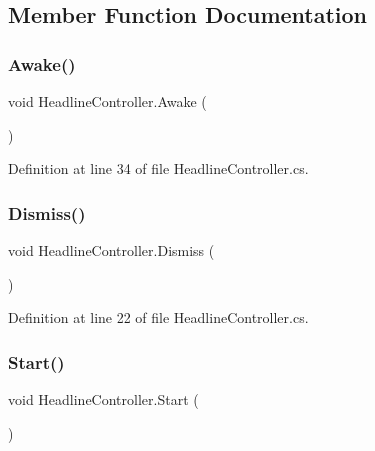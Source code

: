 \subsection{Member Function Documentation}
\mbox{\label{class_headline_controller_adb69e776ca5b30c61080f59057ad1137}} 
\subsubsection{\texorpdfstring{Awake()}{Awake()}}
{\footnotesize\ttfamily void Headline\+Controller.\+Awake (\begin{DoxyParamCaption}{ }\end{DoxyParamCaption})}



Definition at line 34 of file Headline\+Controller.\+cs.

\mbox{\label{class_headline_controller_acd329fcd0eb7c55ceecdf01d14774847}} 
\subsubsection{\texorpdfstring{Dismiss()}{Dismiss()}}
{\footnotesize\ttfamily void Headline\+Controller.\+Dismiss (\begin{DoxyParamCaption}{ }\end{DoxyParamCaption})}



Definition at line 22 of file Headline\+Controller.\+cs.

\mbox{\label{class_headline_controller_afdc68788b7f96aad60909e794e55d647}} 
\subsubsection{\texorpdfstring{Start()}{Start()}}
{\footnotesize\ttfamily void Headline\+Controller.\+Start (\begin{DoxyParamCaption}{ }\end{DoxyParamCaption})}



